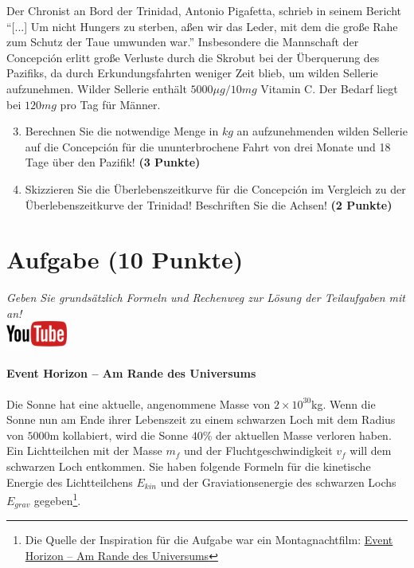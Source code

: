 \documentclass[a4paper, 9pt]{scrartcl}\usepackage[]{graphicx}\usepackage[]{xcolor}
\begin{document}
Der Chronist an Bord der Trinidad, Antonio Pigafetta, schrieb in seinem
Bericht "`[...] Um nicht Hungers zu sterben, a{\ss}en wir das Leder, mit dem
die gro{\ss}e Rahe zum Schutz der Taue umwunden war."' Insbesondere die
Mannschaft der Concepci{\'o}n erlitt gro{\ss}e Verluste durch die Skrobut bei der
{\"U}berquerung des Pazifiks, da durch Erkundungsfahrten weniger Zeit blieb, um
wilden Sellerie aufzunehmen. Wilder Sellerie enth{\"a}lt
$5000\mu g/10mg$ Vitamin C. Der Bedarf liegt bei
$120mg$ pro Tag f{\"u}r M{\"a}nner.

\begin{enumerate}
  \setcounter{enumi}{2}
\item Berechnen Sie die notwendige Menge in $kg$ an
  aufzunehmenden wilden Sellerie auf die Concepci{\'o}n f{\"u}r die ununterbrochene
  Fahrt von drei Monate und 18 Tage {\"u}ber den Pazifik!
  \textbf{(3 Punkte)}
\item Skizzieren Sie die {\"U}berlebenszeitkurve f{\"u}r die Concepci{\'o}n im
  Vergleich zu der {\"U}berlebenszeitkurve der Trinidad! Beschriften Sie die
  Achsen! \textbf{(2 Punkte)}
\end{enumerate}

 
\clearpage

\section{Aufgabe \hfill (10 Punkte)}

\textit{Geben Sie grunds{\"a}tzlich Formeln und Rechenweg zur L{\"o}sung der
  Teilaufgaben mit an!} \\[1Ex]

\hfill\href{https://youtu.be/q-qYK4Chslg}{\includegraphics[width =
  2cm]{img/youtube}} %
\hspace{2Ex}

\paragraph{Event Horizon -- Am Rande des Universums}



Die Sonne hat eine aktuelle, angenommene Masse von $\ensuremath{2\times 10^{30}}$kg. Wenn
die Sonne nun am Ende ihrer Lebenszeit zu einem schwarzen Loch mit dem
Radius von $5000$m kollabiert, wird die Sonne $40$\%
der aktuellen Masse verloren haben. Ein Lichtteilchen mit der Masse $m_f$
und der Fluchtgeschwindigkeit $v_f$ will dem schwarzen Loch entkommen.  Sie
haben folgende Formeln f{\"u}r die kinetische Energie des Lichtteilchens
$E_{kin}$ und der Graviationsenergie des schwarzen Lochs $E_{grav}$
gegeben\footnote{Die Quelle der Inspiration
  für die Aufgabe war ein Montagnachtfilm:
  \href{https://de.wikipedia.org/wiki/Event_Horizon_–_Am_Rande_des_Universums}{Event Horizon – Am Rande des Universums}}.
\end{document}
